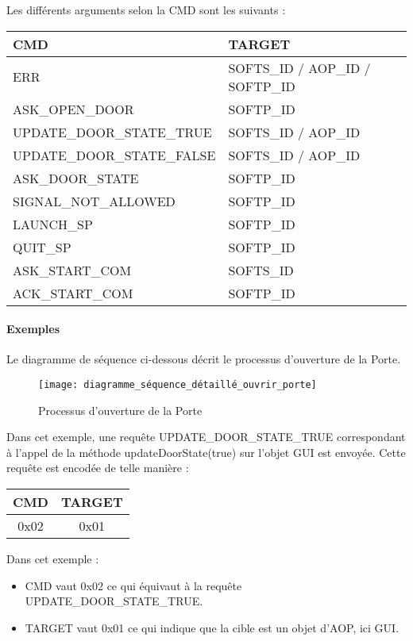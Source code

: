     \begin {table}[H]
    Les différents arguments selon la CMD sont les suivants : 
    \center
    \begin{tabularx}{\textwidth}{|X|X|}
        \hline
        \textbf{CMD} & \textbf{TARGET} \\
        \hline
        ERR & SOFTS\_ID / AOP\_ID / SOFTP\_ID \\
        \hline
        ASK\_OPEN\_DOOR & SOFTP\_ID \\
        \hline 
        UPDATE\_DOOR\_STATE\_TRUE & SOFTS\_ID / AOP\_ID \\
        \hline
        UPDATE\_DOOR\_STATE\_FALSE & SOFTS\_ID / AOP\_ID \\
        \hline
        ASK\_DOOR\_STATE & SOFTP\_ID \\
        \hline
        SIGNAL\_NOT\_ALLOWED & SOFTP\_ID \\
        \hline
        LAUNCH\_SP & SOFTP\_ID \\
        \hline
        QUIT\_SP & SOFTP\_ID \\
        \hline
        ASK\_START\_COM & SOFTS\_ID \\
        \hline
        ACK\_START\_COM & SOFTP\_ID \\
        \hline
    \end{tabularx}
    \end{table}

    \paragraph{Exemples}%

        Le diagramme de séquence ci-dessous décrit le processus d'ouverture de la Porte.

        \begin{figure} [H]
            \centering
            \texttt{[image: diagramme\_séquence\_détaillé\_ouvrir\_porte]}
            \caption{Processus d'ouverture de la Porte}
            \label{Sequ-ouvrirPorte}
        \end{figure}

        Dans cet exemple, une requête UPDATE\_DOOR\_STATE\_TRUE correspondant à l'appel de la méthode updateDoorState(true) sur l'objet GUI est envoyée.
        Cette requête est encodée de telle manière : 

        \begin {table}[H]
        \center
        \begin{tabular}{|c|c|}
            \hline
            \textbf{CMD} & \textbf{TARGET} \\
            \hline
            0x02 & 0x01 \\
            \hline
        \end{tabular}
        \end{table}

        Dans cet exemple : 

        \begin{itemize}
            \item {CMD vaut 0x02 ce qui équivaut à la requête UPDATE\_DOOR\_STATE\_TRUE.}
            \item {TARGET vaut 0x01 ce qui indique que la cible est un objet d'AOP, ici GUI.}
        \end{itemize} 
